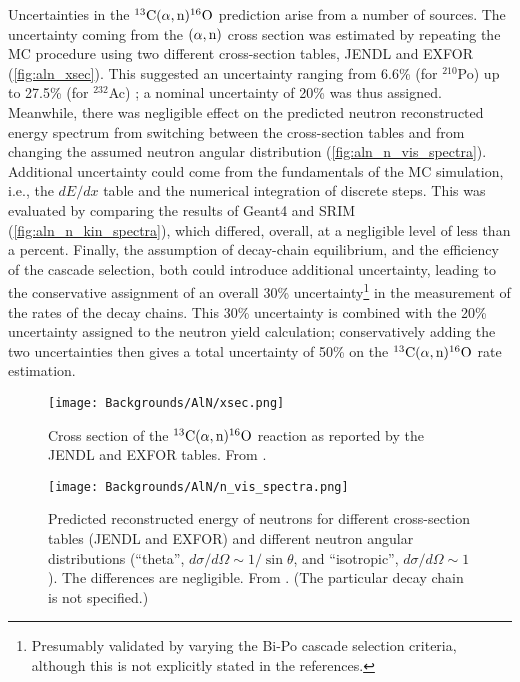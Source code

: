 \documentclass[../thesis.tex]{subfiles}
\begin{document}
Uncertainties in the $^{13}\mathrm{C}(\alpha, \mathrm{n})^{16}\mathrm{O}$ prediction arise from a number of sources. The uncertainty coming from the $(\alpha,\mathrm{n})$ cross section was estimated by repeating the MC procedure using two different cross-section tables, JENDL \cite{jendl} and EXFOR \cite{exfor} (\autoref{fig:aln_xsec}). This suggested an uncertainty ranging from 6.6\% (for $^{210}$Po) up to 27.5\% (for $^{232}$Ac) \cite{Zhao_2014}; a nominal uncertainty of 20\% was thus assigned. Meanwhile, there was negligible effect on the predicted neutron reconstructed energy spectrum from switching between the cross-section tables and from changing the assumed neutron angular distribution (\autoref{fig:aln_n_vis_spectra}). Additional uncertainty could come from the fundamentals of the MC simulation, i.e., the $dE/dx$ table and the numerical integration of discrete steps. This was evaluated by comparing the results of Geant4 \cite{Geant4} and SRIM \cite{SRIM} (\autoref{fig:aln_n_kin_spectra}), which differed, overall, at a negligible level of less than a percent. Finally, the assumption of decay-chain equilibrium, and the efficiency of the cascade selection, both could introduce additional uncertainty, leading to the conservative assignment of an overall 30\% uncertainty\footnote{Presumably validated by varying the Bi-Po cascade selection criteria, although this is not explicitly stated in the references.} in the measurement of the rates of the decay chains. This 30\% uncertainty is combined with the 20\% uncertainty assigned to the neutron yield calculation; conservatively adding the two uncertainties then gives a total uncertainty of 50\% on the $^{13}\mathrm{C}(\alpha, \mathrm{n})^{16}\mathrm{O}$ rate estimation.

\begin{figure}[ht]
  \texttt{[image: Backgrounds/AlN/xsec.png]}
  \caption{Cross section of the $^{13}\mathrm{C}(\alpha, \mathrm{n})^{16}\mathrm{O}$ reaction as reported by the JENDL and EXFOR tables. From \cite{Zhao_2014}.}
  \label{fig:aln_xsec}
\end{figure}

\begin{figure}[ht]
  \texttt{[image: Backgrounds/AlN/n\_vis\_spectra.png]}
  \caption{Predicted reconstructed energy of neutrons for different cross-section tables (JENDL and EXFOR) and different neutron angular distributions (``theta'', $d\sigma/d\Omega \sim 1/\sin\theta$, and ``isotropic'', $d\sigma/d\Omega \sim 1$). The differences are negligible. From \cite{Zhao_2014}. (The particular decay chain is not specified.)}
  \label{fig:aln_n_vis_spectra}
\end{figure}
\end{document}
